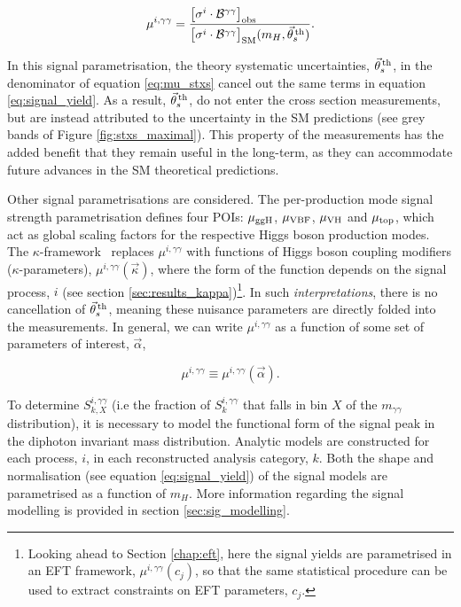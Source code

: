 \begin{equation}\label{eq:mu_stxs}
    \mu^{i,\gamma\gamma} = \frac{\big[\sigma^i \cdot \mathcal{B}^{\gamma\gamma} \big]_{\rm{obs}}\hfill}{\big[\sigma^i \cdot \mathcal{B}^{\gamma\gamma} \big]_{\rm{SM}}(m_H,\vec{\theta}^{\,\rm{th}}_{s})}.
\end{equation}

\noindent
In this signal parametrisation, the theory systematic uncertainties, $\vec{\theta}^{\,\rm{th}}_{s}$, in the denominator of equation \ref{eq:mu_stxs} cancel out the same terms in equation \ref{eq:signal_yield}. As a result, $\vec{\theta}^{\,\rm{th}}_{s}$, do not enter the cross section measurements, but are instead attributed to the uncertainty in the SM predictions (see grey bands of Figure \ref{fig:stxs_maximal}). This property of the measurements has the added benefit that they remain useful in the long-term, as they can accommodate future advances in the SM theoretical predictions.

Other signal parametrisations are considered. The per-production mode signal strength parametrisation defines four POIs: $\mu_{\rm{ggH}}$, $\mu_{\rm{VBF}}$, $\mu_{\rm{VH}}$ and $\mu_{\rm{top}}$, which act as global scaling factors for the respective Higgs boson production modes. The $\kappa$-framework~\cite{Heinemeyer:2013tqa} replaces $\mu^{i,\gamma\gamma}$ with functions of Higgs boson coupling modifiers ($\kappa$-parameters), $\mu^{i,\gamma\gamma}(\vec{\kappa})$, where the form of the function depends on the signal process, $i$ (see section \ref{sec:results_kappa})\footnote{Looking ahead to Section \ref{chap:eft}, here the signal yields are parametrised in an EFT framework, $\mu^{i,\gamma\gamma}(c_j)$, so that the same statistical procedure can be used to extract constraints on EFT parameters, $c_j$.}. In such \textit{interpretations}, there is no cancellation of $\vec{\theta}^{\,\rm{th}}_{s}$, meaning these nuisance parameters are directly folded into the measurements. In general, we can write $\mu^{i,\gamma\gamma}$ as a function of some set of parameters of interest, $\vec{\alpha}$,

\begin{equation}
    \mu^{i,\gamma\gamma} \equiv \mu^{i,\gamma\gamma}(\vec{\alpha}).
\end{equation}

To determine $S_{k,X}^{i,\gamma\gamma}$ (i.e the fraction of $S_k^{i,\gamma\gamma}$ that falls in bin $X$ of the $m_{\gamma\gamma}$ distribution), it is necessary to model the functional form of the signal peak in the diphoton invariant mass distribution. Analytic models are constructed for each process, $i$, in each reconstructed analysis category, $k$. Both the shape and normalisation (see equation \ref{eq:signal_yield}) of the signal models are parametrised as a function of $m_H$. More information regarding the signal modelling is provided in section \ref{sec:sig_modelling}.

